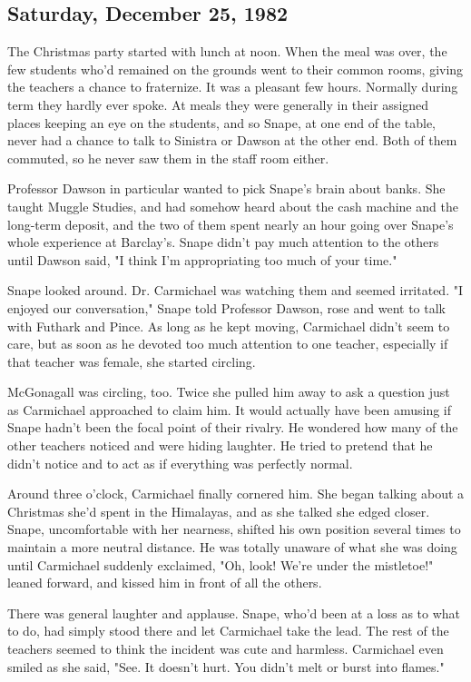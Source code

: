 \subsection{Saturday, December 25, 1982}

The Christmas party started with lunch at noon. When the meal was over, the few students who'd remained on the grounds went to their common rooms, giving the teachers a chance to fraternize. It was a pleasant few hours. Normally during term they hardly ever spoke. At meals they were generally in their assigned places keeping an eye on the students, and so Snape, at one end of the table, never had a chance to talk to Sinistra or Dawson at the other end. Both of them commuted, so he never saw them in the staff room either.

Professor Dawson in particular wanted to pick Snape's brain about banks. She taught Muggle Studies, and had somehow heard about the cash machine and the long-term deposit, and the two of them spent nearly an hour going over Snape's whole experience at Barclay's. Snape didn't pay much attention to the others until Dawson said, "I think I'm appropriating too much of your time."

Snape looked around. Dr. Carmichael was watching them and seemed irritated. "I enjoyed our conversation," Snape told Professor Dawson, rose and went to talk with Futhark and Pince. As long as he kept moving, Carmichael didn't seem to care, but as soon as he devoted too much attention to one teacher, especially if that teacher was female, she started circling.

McGonagall was circling, too. Twice she pulled him away to ask a question just as Carmichael approached to claim him. It would actually have been amusing if Snape hadn't been the focal point of their rivalry. He wondered how many of the other teachers noticed and were hiding laughter. He tried to pretend that he didn't notice and to act as if everything was perfectly normal.

Around three o'clock, Carmichael finally cornered him. She began talking about a Christmas she'd spent in the Himalayas, and as she talked she edged closer. Snape, uncomfortable with her nearness, shifted his own position several times to maintain a more neutral distance. He was totally unaware of what she was doing until Carmichael suddenly exclaimed, "Oh, look! We're under the mistletoe!" leaned forward, and kissed him in front of all the others.

There was general laughter and applause. Snape, who'd been at a loss as to what to do, had simply stood there and let Carmichael take the lead. The rest of the teachers seemed to think the incident was cute and harmless. Carmichael even smiled as she said, "See. It doesn't hurt. You didn't melt or burst into flames."

